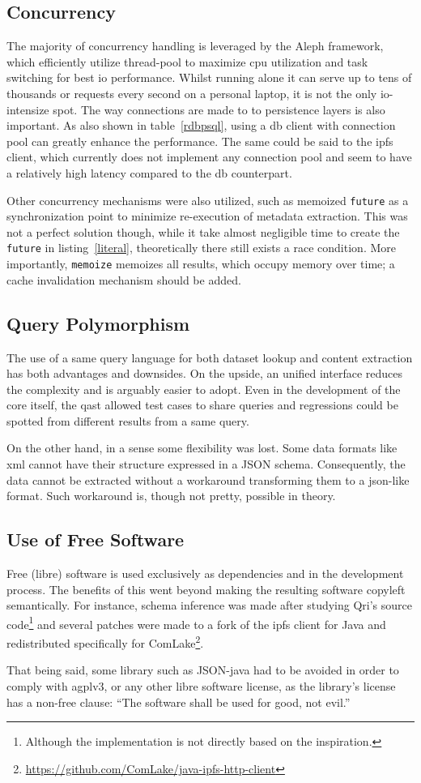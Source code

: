 \subsection{Concurrency}
The majority of concurrency handling is leveraged by the Aleph framework,
which efficiently utilize thread-pool to maximize \gls{cpu} utilization
and task switching for best \gls{io} performance.  Whilst running alone it can
serve up to tens of thousands or requests every second on a personal laptop,
it is not the only \gls{io}-intensize spot.  The way connections are made to
to persistence layers is also important.  As also shown in table~\ref{rdbpsql},
using a \gls{db} client with connection pool can greatly enhance
the performance.  The same could be said to the \gls{ipfs} client,
which currently does not implement any connection pool and seem to have
a relatively high latency compared to the \gls{db} counterpart.

Other concurrency mechanisms were also utilized, such as memoized \verb|future|
as a synchronization point to minimize re-execution of metadata extraction.
This was not a perfect solution though, while it take almost negligible time
to create the \verb|future| in listing~\ref{literal}, theoretically there still
exists a race condition.  More importantly, \verb|memoize| memoizes all results,
which occupy memory over time; a cache invalidation mechanism should be added.

\subsection{Query Polymorphism}
The use of a same query language for both dataset lookup and content extraction
has both advantages and downsides.  On the upside, an unified interface
reduces the complexity and is arguably easier to adopt.  Even in the development
of the core itself, the \gls{qast} allowed test cases to share queries
and regressions could be spotted from different results from a same query.

On the other hand, in a sense some flexibility was lost.  Some data formats
like \gls{xml} cannot have their structure expressed in a JSON schema.
Consequently, the data cannot be extracted without a workaround transforming
them to a \gls{json}-like format.  Such workaround is, though not pretty,
possible in theory.

\subsection{Use of Free Software}
Free (libre) software is used exclusively as dependencies and in the development
process.  The benefits of this went beyond making the resulting software
copyleft semantically.  For instance, schema inference was made after
studying Qri's source code\footnote{Although the implementation is not
directly based on the inspiration.} and several patches were made to a fork
of the \gls{ipfs} client for Java and redistributed specifically for
ComLake\footnote{\url{https://github.com/ComLake/java-ipfs-http-client}}.

That being said, some library such as JSON-java had to be avoided in order
to comply with \gls{agplv3}, or any other libre software license, as the
library's license has a non-free clause: ``The software shall be used for good,
not evil.''

